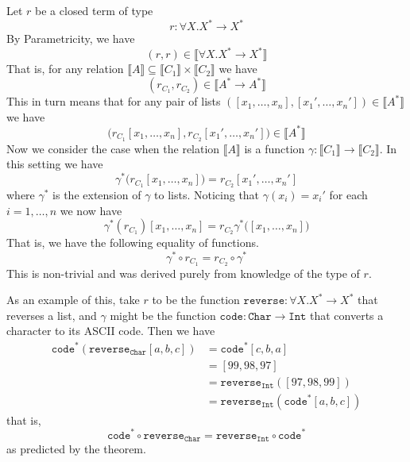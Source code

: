 \documentclass[12pt]{article}
\theoremstyle{plain}
\theoremstyle{definition}
\newcommand{\lto}{\longrightarrow}
\begin{document}
		Let $r$ be a closed term of type
		\begin{equation}
			r: \forall X. X^\ast \lto X^\ast
			\end{equation}
		By Parametricity, we have
		\begin{equation}
			(r,r) \in \llbracket \forall X. X^\ast \lto X^\ast \rrbracket
			\end{equation}
		That is, for any relation $\llbracket A \rrbracket \subseteq \llbracket C_1 \rrbracket \times \llbracket C_2 \rrbracket$ we have
		\begin{equation}
			(r_{C_1}, r_{C_2}) \in \llbracket A^\ast \lto A^\ast \rrbracket
			\end{equation}
		This in turn means that for any pair of lists $([x_1, \ldots, x_n], [x_1',\ldots, x_n']) \in \llbracket A^\ast \rrbracket$ we have
		\begin{equation}
			\big(r_{C_1}[x_1, \ldots, x_n], r_{C_2}[x_1', \ldots, x_n']\big) \in \llbracket A^\ast \rrbracket
			\end{equation}
		Now we consider the case when the relation $\llbracket A \rrbracket$ is a function $\gamma: \llbracket C_1 \rrbracket \lto \llbracket C_2 \rrbracket$. In this setting we have
		\begin{equation}
			\gamma^\ast\big(r_{C_1}[x_1, \ldots, x_n]\big) = r_{C_2}[x_1', \ldots, x_n']
			\end{equation}
		where $\gamma^\ast$ is the extension of $\gamma$ to lists. Noticing that $\gamma(x_i) = x_i'$ for each $i = 1, \ldots, n$ we now have
		\begin{equation}
			\gamma^\ast(r_{C_1})[x_1, \ldots, x_n] = r_{C_2}\gamma^\ast\big([x_1, \ldots, x_n]\big)
			\end{equation}
		That is, we have the following equality of functions.
		\begin{equation}
			\gamma^\ast \circ r_{C_1} = r_{C_2} \circ \gamma^\ast
			\end{equation}
		This is non-trivial and was derived purely from knowledge of the type of $r$.
		
		As an example of this, take $r$ to be the function $\texttt{reverse}: \forall X. X^\ast \lto X^\ast$ that reverses a list, and $\gamma$ might be the function $\texttt{code}: \texttt{Char} \lto \texttt{Int}$ that converts a character to its ASCII code. Then we have
		\begin{align*}
			\texttt{code}^\ast(\texttt{reverse}_{\texttt{Char}}[a,b,c]) &= \texttt{code}^\ast[c,b,a]\\
			&= [99, 98, 97]\\
			&= \texttt{reverse}_{\texttt{Int}}([97,98,99])\\
			&= \texttt{reverse}_{\texttt{Int}}(\texttt{code}^\ast[a,b,c])
			\end{align*}
		that is,
		\begin{equation}
			\texttt{code}^\ast \circ \texttt{reverse}_{\texttt{Char}} = \texttt{reverse}_{\texttt{Int}}\circ \texttt{code}^\ast
			\end{equation}
		as predicted by the theorem.
		
\end{document}
